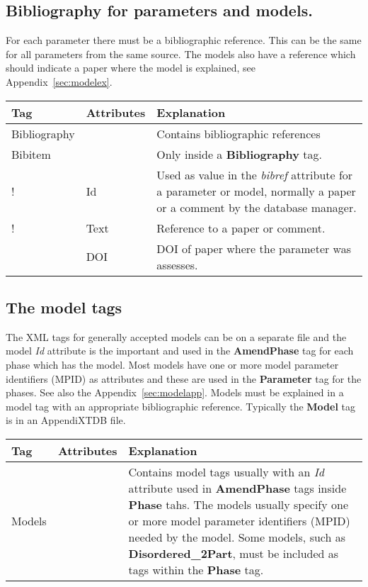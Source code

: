\documentclass{article}
\begin{document}
\subsection{Bibliography for parameters and models.}\label{sec:biblio}

For each parameter there must be a bibliographic reference.  This can
be the same for all parameters from the same source.  The models also
have a reference which should indicate a paper where the model is
explained, see Appendix~\ref{sec:modelex}.

\bigskip
\begin{tabular}{|p{} p{} p{}|}\hline
  Tag & Attributes &  Explanation\\\hline

  Bibliography & & Contains bibliographic references\\\hline

  Bibitem & & Only inside a {\bf Bibliography} tag.\\
!      & Id &   Used as value in the {\em bibref} attribute for a parameter
            or model, normally a paper or a comment by the database manager.\\
!      & Text & Reference to a paper or comment.\\
       & DOI & DOI of paper where the parameter was assesses.\\\hline
\end{tabular}

\subsection{The model tags}\label{sec:models}

The XML tags for generally accepted models can be on a separate file
and the model {\em Id} attribute is the important and used in the {\bf
  AmendPhase} tag for each phase which has the model.  Most models
have one or more model parameter identifiers (MPID) as attributes and
these are used in the {\bf Parameter} tag for the phases.  See also
the Appendix~\ref{sec:modelapp}.  Models must be explained in a model
tag with an appropriate bibliographic reference.  Typically the {\bf
  Model} tag is in an AppendiXTDB file.

\bigskip
\begin{tabular}{|p{} p{} p{}|}\hline
  Tag & Attributes & Explanation\\\hline

  Models & & Contains model tags usually with an {\em Id} attribute
  used in {\bf AmendPhase} tags inside {\bf Phase} tahs.  The models
  usually specify one or more model parameter identifiers (MPID)
  needed by the model.  Some models, such as {\bf Disordered\_2Part},
  must be included as tags within the {\bf Phase} tag.\\\hline
\end{tabular}
\end{document}

